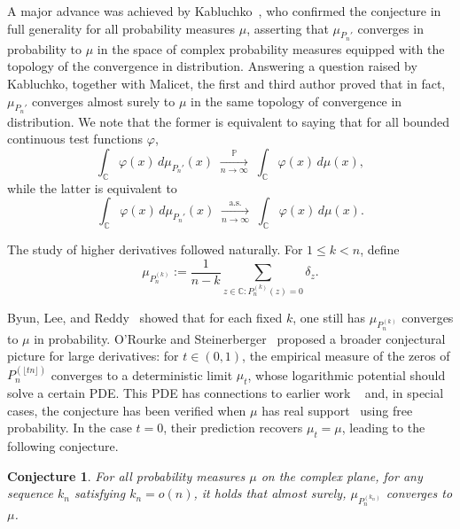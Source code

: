 \documentclass[12pt, reqno]{amsart}
\theoremstyle{plain}
\newtheorem{conjecture}[theorem]{Conjecture}
\theoremstyle{definition}
\begin{document}
 \medskip
 A major advance was achieved by Kabluchko~\cite{Kabluchko2015}, who confirmed the conjecture in full generality for all probability measures $\mu$, asserting that $\mu_{P_n'}$ converges in probability to $\mu$  in the space of complex probability measures equipped with the topology of the convergence in distribution.  Answering a question raised by Kabluchko, together with Malicet, the first and third author \cite{angst2024almost} proved that in fact, $\mu_{P_n'}$ converges almost surely to $\mu$ in the same topology of convergence in distribution. We note that the former is equivalent to saying that for all bounded continuous test functions $\varphi$,
 \[
 \int_{\mathbb{C}} \varphi(x) \, d\mu_{P_n'}(x)
 \;\xrightarrow[n\to\infty]{\mathbb{P}}\;
 \int_{\mathbb{C}} \varphi(x) \, d\mu(x),
 \]
 while the latter is equivalent to  
 \[
 \int_{\mathbb{C}} \varphi(x) \, d\mu_{P_n'}(x)
 \;\xrightarrow[n\to\infty]{\text{a.s.}}\;
 \int_{\mathbb{C}} \varphi(x) \, d\mu(x).
 \]
 
 \vspace{5mm}
 The study of higher derivatives followed naturally.  
 For $1 \leq k < n$, define
 \[
 \mu_{P_n^{(k)}} := \frac{1}{n-k} \sum_{z \in \mathbb{C} : P_n^{(k)}(z) = 0} \delta_z.
 \]
 
 
 Byun, Lee, and Reddy~\cite{ByunLeeReddy2022} showed that for each fixed $k$, one still has $\mu_{P_n^{(k)}}$ converges to $\mu$ in probability.
 O’Rourke and Steinerberger~\cite{ORourkeSteinerberger2021} proposed a broader conjectural picture for large derivatives: for $t \in (0,1)$, the empirical measure of the zeros of $P_n^{(\lfloor tn \rfloor)}$ converges to a deterministic limit $\mu_t$, whose logarithmic potential should solve a certain PDE.  
 This PDE has connections to earlier work ~\cite{alazard2022dynamics, kiselev2022flow} and, in special cases, the conjecture has been verified when $\mu$ has real support~\cite{hoskins2023dynamics} using free probability.  
 In the case $t=0$, their prediction recovers $\mu_t = \mu$, leading to the following conjecture.
 \begin{conjecture}\label{conj}
 	For all probability measures $\mu$ on the complex plane, for any sequence $k_n$ satisfying $k_n=o(n)$, it holds that almost surely, $\mu_{P_n^{(k_n)}}$ converges  to $ \mu$.
 \end{conjecture}
 
\end{document}
